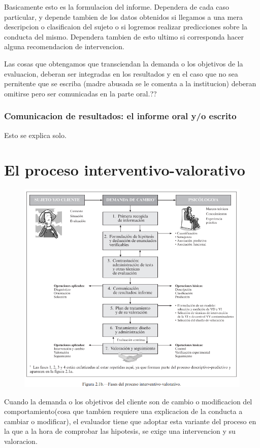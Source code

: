 \documentclass[12pt,a4paper]{article}
\begin{document}
Basicamente esto es la formulacion del informe. Dependera de cada caso particular, y depende tambien de los datos obtenidos si llegamos a una mera descripcion o clasificaion del sujeto o si logremos realizar predicciones sobre la conducta del mismo. Dependera tambien de esto ultimo si corresponda hacer alguna recomendacion de intervencion. 

Las cosas que obtengamos que transciendan la demanda o los objetivos de la evaluacion, deberan ser integradas en los resultados y en el caso que no sea pernitente que se escriba (madre abusada se le comenta a la institucion) deberan omitirse pero ser comunicadas en la parte oral.??

\subsubsection{Comunicacion de resultados: el informe oral y/o escrito}%

Esto se explica solo.

\section{El proceso interventivo-valorativo}%

\begin{figure}[!h!]
	\centering
	\includegraphics[width=0.8\linewidth]{fases1.png}
	\label{fig:fases1}
\end{figure}

Cuando la demanda o los objetivos del cliente son de cambio o modificacion del comportamiento(cosa que tambien requiere una explicacion de la conducta a cambiar o modificar), el evaluador tiene que adoptar esta variante del proceso en la que a la hora de comprobar las hipotesis, se exige una intervencion y su valoracion.
\end{document}
